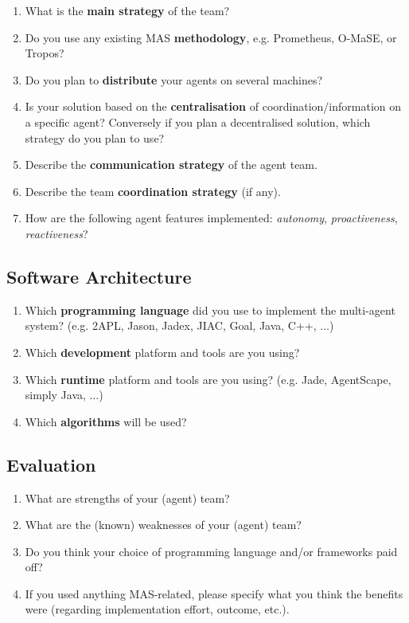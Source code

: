 \documentclass{article}
\begin{document}
\begin{enumerate}
  \item What is the \textbf{main strategy} of the team?
  \item Do you use any existing MAS \textbf{methodology}, e.g. Prometheus, O-MaSE, or Tropos?
  \item Do you plan to \textbf{distribute} your agents on several machines?
  \item Is your solution based on the \textbf{centralisation} of
   coordination/information on a specific agent? Conversely if you
   plan a decentralised solution, which strategy do you plan to use?
  \item Describe the \textbf{communication strategy} of the agent team.
  \item Describe the team \textbf{coordination strategy} (if any).
  \item How are the following agent features implemented:
   \emph{autonomy}, \emph{proactiveness}, \emph{reactiveness}?
\end{enumerate}

\subsection*{Software Architecture}

\begin{enumerate}
  \item Which \textbf{programming language} did you use to implement the
    multi-agent system? (e.g. 2APL, Jason, Jadex, JIAC, Goal, Java, C++, $\ldots$)
  \item Which \textbf{development} platform and tools are you using?
  \item Which \textbf{runtime} platform and tools are you using? (e.g. Jade, AgentScape, simply Java, $\ldots$)
  \item Which \textbf{algorithms} will be used?
\end{enumerate}

\subsection*{Evaluation}

\begin{enumerate}
  \item What are strengths of your (agent) team?
  \item What are the (known) weaknesses of your (agent) team?
  \item Do you think your choice of programming language and/or frameworks paid off?
  \item If you used anything MAS-related, please specify what you think the benefits were (regarding implementation effort, outcome, etc.).
\end{enumerate}
\end{document}
